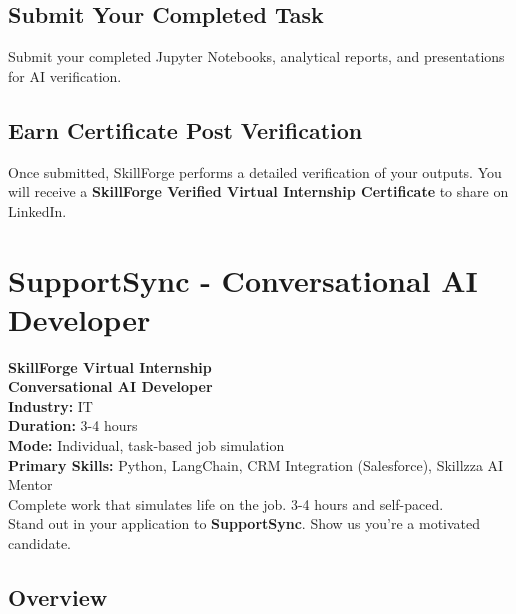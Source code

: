 \documentclass{article}
\begin{document}
\subsection*{Submit Your Completed Task}
Submit your completed Jupyter Notebooks, analytical reports, and presentations for AI verification.\\

\subsection*{Earn Certificate Post Verification}
Once submitted, SkillForge performs a detailed verification of your outputs. You will receive a \textbf{SkillForge Verified Virtual Internship Certificate} to share on LinkedIn.\\

\newpage

\section{SupportSync - Conversational AI Developer}

\textbf{SkillForge Virtual Internship} \\
\textbf{Conversational AI Developer} \\

\textbf{Industry:} IT \\
\textbf{Duration:} 3-4 hours \\
\textbf{Mode:} Individual, task-based job simulation \\
\textbf{Primary Skills:} Python, LangChain, CRM Integration (Salesforce), Skillzza AI Mentor \\

Complete work that simulates life on the job. 3-4 hours and self-paced. \\
Stand out in your application to \textbf{SupportSync}. Show us you're a motivated candidate. \\

\subsection*{Overview}
\end{document}
